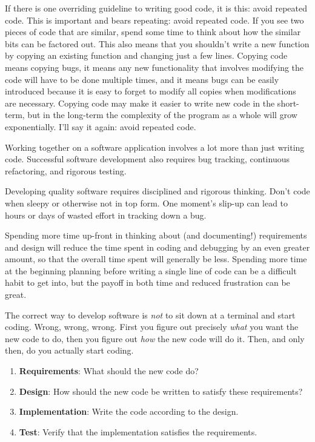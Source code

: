 \documentclass{article}
\begin{document}
If there is one overriding guideline to writing good code, it is this:
avoid repeated code.  This is important and bears repeating: avoid
repeated code.  If you see two pieces of code that are similar, spend
some time to think about how the similar bits can be factored out.
This also means that you shouldn't write a new function by copying an
existing function and changing just a few lines.  Copying code means
copying bugs, it means any new functionality that involves modifying
the code will have to be done multiple times, and it means bugs can be
easily introduced because it is easy to forget to modify all copies
when modifications are necessary.  Copying code may make it easier to
write new code in the short-term, but in the long-term the complexity
of the program as a whole will grow exponentially.  I'll say it again:
avoid repeated code.

Working together on a software application involves a lot more than
just writing code.  Successful software development also requires bug
tracking, continuous refactoring, and rigorous testing.

Developing quality software requires disciplined and rigorous
thinking.  Don't code when sleepy or otherwise not in top form.  One
moment's slip-up can lead to hours or days of wasted effort in
tracking down a bug.  

Spending more time up-front in thinking about (and documenting!) 
requirements and design will reduce the time spent in coding and
debugging by an even greater amount, so that the overall time spent
will generally be less.  Spending more time at the beginning planning
before writing a single line of code can be a difficult habit to get
into, but the payoff in both time and reduced frustration can be
great.

The correct way to develop software is \textit{not} to sit down at a
terminal and start coding.  Wrong, wrong, wrong.  First you figure out
precisely \textit{what} you want the new code to do, then you figure
out \textit{how} the new code will do it.  Then, and only then, do you
actually start coding.

\begin{enumerate}
\item \textbf{Requirements}: What should the new code do?
\item \textbf{Design}: How should the new code be written to satisfy these requirements?
\item \textbf{Implementation}: Write the code according to the design.
\item \textbf{Test}: Verify that the implementation satisfies the requirements.
\end{enumerate}
\end{document}
